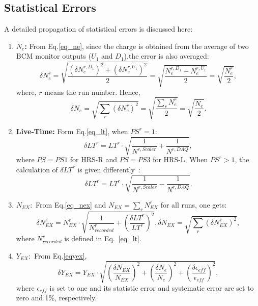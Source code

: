 \subsection{Statistical Errors}
 A detailed propagation of statistical errors is discussed here:
\begin{enumerate}

\item \textbf{$N_{e}$:} From Eq.\ref{eq_ne}, since the charge is obtained from the average of two BCM monitor outputs ($U_{1}$ and $D_{1}$),the error is also averaged:
  \begin{equation}
   \delta N_{e}^{r} = \sqrt{\frac{\left(\delta N_{e}^{r,D_{1}}\right)^{2}+\left(\delta N_{e}^{r,U_{1}}\right)^{2}}{2}}
                    = \sqrt{\frac{N_{e}^{r,D_{1}}+N_{e}^{r,U_{1}}}{2}}
                    = \sqrt{\frac{N_{e}^{r}}{2}},
  \end{equation}
where, $r$ means the run number. Hence,
  \begin{equation}
    \delta N_{e} = \sqrt{\sum_{r}\left(\delta N_{e}^{r}\right)^{2}}=\sqrt{\frac{\sum_{r}N_{e}^{r}}{2}}=\sqrt{\frac{N_{e}}{2}}.
  \end{equation}
  
\item \textbf{Live-Time:} Form Eq.\ref{eq_lt}, when  $PS^{r} = 1$:
  \begin{equation}
    \delta LT^{r} = LT^{r} \cdot \sqrt{\frac{1}{N^{r,Scaler}}+\frac{1}{N^{r,DAQ}}},
  \end{equation}
where $PS=PS1$ for HRS-R and $PS=PS3$ for HRS-L. When  $PS^{r} > 1$, the calculation of $\delta LT^{r}$ is given differently~\cite{vince_thesis}:
 \begin{equation}
   \delta LT^{r} = LT^{r} \cdot \sqrt{\frac{1}{N^{r,Scaler}}-\frac{1}{N^{r,DAQ}}}.
 \end{equation}

\item \textbf{$N_{EX}:$} From  Eq.\ref{eq_nex} and $N_{EX}=\sum_{r}N_{EX}^{r}$ for all runs, one gets:
  \begin{equation}
    \delta N_{EX}^{r} = N_{EX}^{r} \cdot \sqrt{\frac{1}{N_{recorded}^{r}} + \left(\frac{\delta LT^{r}}{LT^{r}}\right)^{2} }, \delta N_{EX}=\sqrt{\sum_{r}\left(\delta N_{EX}^{r}\right)^{2}},
  \end{equation}
where $N_{recorded}^{r}$ is defined in Eq.~\eqref{eq_lt}. 

\item \textbf{$Y_{EX}:$} From Eq.\ref{eqyex},
  \begin{equation}
    \delta Y_{EX} =  Y_{EX} \cdot \sqrt{\left(\frac{\delta N_{EX}}{N_{EX}}\right)^{2}+\left(\frac{\delta N_{e}}{N_{e}}\right)^{2}+\left(\frac{\delta\epsilon_{eff}}{\epsilon_{eff}}\right)^{2}},
  \end{equation}
where $\epsilon_{eff}$ is set to one and its statistic error and systematic error are set to zero and 1\%, respectively.


\end{enumerate}

